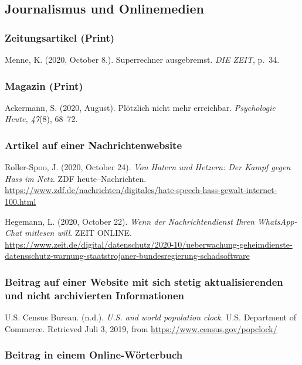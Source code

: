 \documentclass[
  letterpaper,
  DIV=11]{scrreprt}
\begin{document}
\subsection{Journalismus und
Onlinemedien}\label{journalismus-und-onlinemedien}

\subsubsection{Zeitungsartikel (Print)}\label{zeitungsartikel-print}

Menne, K. (2020, October 8.). Superrechner ausgebremst. \emph{DIE ZEIT},
p.~34.

\subsubsection{Magazin (Print)}\label{magazin-print}

Ackermann, S. (2020, August). Plötzlich nicht mehr erreichbar.
\emph{Psychologie Heute, 47}(8), 68--72.

\subsubsection{Artikel auf einer
Nachrichtenwebsite}\label{artikel-auf-einer-nachrichtenwebsite}

Roller-Spoo, J. (2020, October 24). \emph{Von Hatern und Hetzern‎: Der
Kampf gegen Hass im Netz‎}. ZDF heute--Nachrichten.
\url{https://www.zdf.de/nachrichten/digitales/hate-speech-hass-gewalt-internet-100.html}

Hegemann, L. (2020, October 22). \emph{Wenn der Nachrichtendienst Ihren
WhatsApp-Chat mitlesen will}. ZEIT ONLINE.
\url{https://www.zeit.de/digital/datenschutz/2020-10/ueberwachung-geheimdienste-datensschutz-warnung-staatstrojaner-bundesregierung-schadsoftware}

\subsubsection{Beitrag auf einer Website mit sich stetig
aktualisierenden und nicht archivierten
Informationen}\label{beitrag-auf-einer-website-mit-sich-stetig-aktualisierenden-und-nicht-archivierten-informationen}

U.S. Census Bureau. (n.d.). \emph{U.S. and world population clock}. U.S.
Department of Commerce. Retrieved Juli 3, 2019, from
\url{https://www.census.gov/popclock/}

\subsubsection{Beitrag in einem
Online-Wörterbuch}\label{beitrag-in-einem-online-wuxf6rterbuch}
\end{document}

